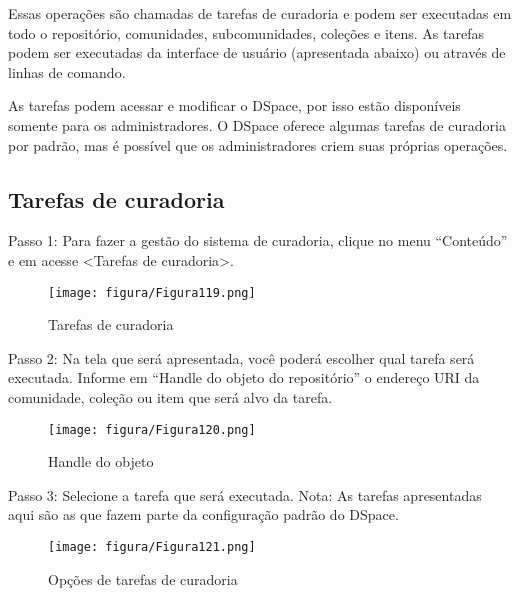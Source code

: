 \documentclass[12pt,hidelinks]{article}
\begin{document}
    \singlespacing
    
    Essas operações são chamadas de tarefas de curadoria e podem ser executadas em todo o repositório, comunidades, subcomunidades, coleções e itens. As tarefas podem ser executadas da interface de usuário (apresentada abaixo) ou através de linhas de comando.
    
    \singlespacing
    
    As tarefas podem acessar e modificar o DSpace, por isso estão disponíveis somente para os administradores. O DSpace oferece algumas tarefas de curadoria por padrão, mas é possível que os administradores criem suas próprias operações.
    
    \subsection{Tarefas de curadoria}
    
    Passo 1: Para fazer a gestão do sistema de curadoria, clique no menu “Conteúdo” e em acesse <Tarefas de curadoria>.
    
    \begin{figure}[!htp]
                \centering
                \texttt{[image: figura/Figura119.png]}
                \caption{Tarefas de curadoria}
            \label{Rotulo}
        \end{figure}

\newpage
    
    Passo 2: Na tela que será apresentada, você poderá escolher qual tarefa será executada. Informe em “Handle do objeto do repositório” o endereço URI da comunidade, coleção ou item que será alvo da tarefa.
    
    \begin{figure}[!htp]
                \centering
                \texttt{[image: figura/Figura120.png]}
                \caption{Handle do objeto}
            \label{Rotulo}
        \end{figure}
    
    Passo 3: Selecione a tarefa que será executada. Nota: As tarefas apresentadas aqui são as que fazem parte da configuração padrão do DSpace.
    
    \begin{figure}[!htp]
                \centering
                \texttt{[image: figura/Figura121.png]}
                \caption{Opções de tarefas de curadoria}
            \label{Rotulo}
        \end{figure}
    
\end{document}
